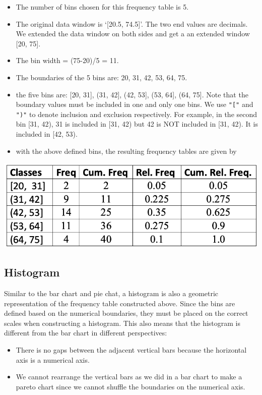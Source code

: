\documentclass[
]{book}
\begin{document}
\begin{itemize}
\item
  The number of bins chosen for this frequency table is 5.
\item
  The original data window is `{[}20.5, 74.5{]}'. The two end values are decimals. We extended the data window on both sides and get a an extended window {[}20, 75{]}.
\item
  The bin width = (75-20)/5 = 11.
\item
  The boundaries of the 5 bins are: 20, 31, 42, 53, 64, 75.
\item
  the five bins are: {[}20, 31{]}, (31, 42{]}, (42, 53{]}, (53, 64{]}, (64, 75{]}. Note that the boundary values must be included in one and only one bins. We use \texttt{"{[}"} and \texttt{")"} to denote inclusion and exclusion respectively. For example, in the second bin {[}31, 42), 31 is included in {[}31, 42) but 42 is NOT included in {[}31, 42). It is included in {[}42, 53).
\item
  with the above defined bins, the resulting frequency tables are given by
\end{itemize}

\begin{center}\includegraphics[width=0.6\linewidth]{week01/numFreqTable} \end{center}

\hypertarget{histogram}{%
\subsection{Histogram}\label{histogram}}

Similar to the bar chart and pie chat, a histogram is also a geometric representation of the frequency table constructed above. Since the bins are defined based on the numerical boundaries, they must be placed on the correct scales when constructing a histogram. This also means that the histogram is different from the bar chart in different perspectives:

\begin{itemize}
\item
  There is no gaps between the adjacent vertical bars because the horizontal axis is a numerical axis.
\item
  We cannot rearrange the vertical bars as we did in a bar chart to make a pareto chart since we cannot shuffle the boundaries on the numerical axis.
\end{itemize}
\end{document}
